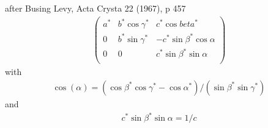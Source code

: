 \documentclass[letterpaper,10pt,english]{sphinxmanual}
\begin{document}
\begin{fulllineitems}
after Busing Levy, Acta Crysta 22 (1967), p 457
\begin{equation*}
\begin{split}\left( \begin{matrix}
a^*  & b^*\cos \gamma^* & c^*\cos beta^*\\
0  & b^*\sin \gamma^* &-c^*\sin \beta^*\cos \alpha\\
0 &  0    &      c^*\sin \beta^*\sin \alpha\\
        \end{matrix} \right)\end{split}
\end{equation*}
with
\begin{equation*}
\begin{split}\cos(\alpha)=(\cos \beta^*\cos \gamma^*-\cos \alpha^*)/(\sin \beta^*\sin \gamma^*)\end{split}
\end{equation*}
and
\begin{equation*}
\begin{split}c^* \sin \beta^* \sin \alpha = 1/c\end{split}
\end{equation*}
\end{fulllineitems}

\end{document}
